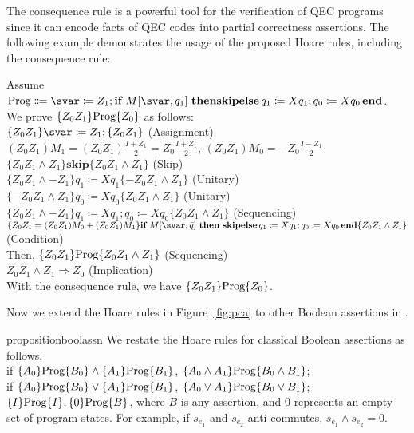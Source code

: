 The consequence rule is a powerful tool for the verification of QEC programs since it can encode facts of QEC codes into partial correctness assertions. 
The following example demonstrates the usage of the proposed Hoare rules, including the consequence rule:
\begin{example}
Assume $\prog\Coloneqq \svar\coloneqq Z_1; \textbf{if}\ M[\svar, q_1]\ \textbf{then}\\\textbf{skip} \textbf{else}\,q_1\coloneqq Xq_1;q_0\coloneqq Xq_0 \,\textbf{end}$. \\We prove  $\{Z_0Z_1\}\text{Prog}\{Z_0\}$ as follows:\\
$\{Z_0Z_1\}\svar\coloneqq Z_1; \{Z_0Z_1\}$ \hfill{} (Assignment) \\
$(Z_0Z_1) M_1 = (Z_0Z_1)\frac{I+Z_1}{2} = Z_0\frac{I+Z_1}{2}$, 
$(Z_0Z_1) M_0 = -Z_0\frac{I-Z_1}{2}$ \\
$\{Z_0Z_1 \wedge Z_1\}\textbf{skip}\{Z_0Z_1 \wedge Z_1\}$ \hfill{}(Skip) \\
$\{Z_0Z_1 \wedge -Z_1\}q_1\coloneqq Xq_1 \{-Z_0Z_1 \wedge Z_1\}$ \hfill{} (Unitary) \\
$\{-Z_0Z_1 \wedge Z_1\} q_0\coloneqq Xq_0 \{Z_0Z_1 \wedge Z_1\}$ \hfill{} (Unitary) \\
$\{Z_0Z_1 \wedge -Z_1\}q_1\coloneqq Xq_1; q_0\coloneqq Xq_0 \{Z_0Z_1 \wedge Z_1\}$ \hfill{} (Sequencing)\\
$\{Z_0Z_1= (Z_0Z_1)M_0+ (Z_0Z_1)M_1\}\textbf{if}\ M[\svar, \bar{q}]\ \textbf{then}\  \textbf{skip}\,\\\textbf{else}\,q_1\coloneqq Xq_1; q_0\coloneqq Xq_0 \,\textbf{end}\{Z_0Z_1 \wedge Z_1\}$ \hfill{} (Condition)\\
Then, $\{Z_0Z_1\}\text{Prog}\{Z_0Z_1 \wedge Z_1\}$ \hfill{} (Sequencing)\\
$Z_0Z_1 \wedge Z_1 \Rightarrow Z_0$ \hfill (Implication) \\
With the consequence rule, we have 
$\{Z_0Z_1\}\text{Prog}\{Z_0\}$.
\end{example}

Now we extend the Hoare rules in Figure~\ref{fig:pca} to other Boolean assertions in \assnname. \nothmskip
\begin{restatable}[]{proposition}{boolassn}
\label{lem:bool-assn}
	We restate the Hoare rules for classical Boolean assertions as follows, \\
	if $\{A_0\}\text{Prog}\{B_0\} \wedge \{A_1\}\text{Prog}\{B_1\}$,  $\{A_0\wedge A_1\}\text{Prog}\{B_0\wedge B_1\}$; \\
	if $\{A_0\}\text{Prog}\{B_0\} \vee \{A_1\}\text{Prog}\{B_1\}$,  $\{A_0\vee A_1\}\text{Prog}\{B_0\vee B_1\}$; \\
	$\{I\}\text{Prog}\{I\}, \{0\}\text{Prog}\{B\}$, where $B$ is any assertion, and $0$ represents an empty set of program states. For example, if $s_{e_1}$ and $s_{e_2}$ anti-commutes, $s_{e_1} \wedge s_{e_2} = 0$.
\end{restatable}\nothmskip
{}


